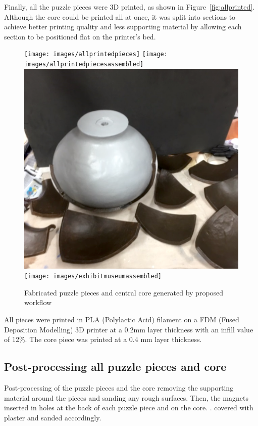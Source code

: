 \documentclass[acmlarge,screen,dvipsnames]{acmart}
\begin{document}
Finally, all the puzzle pieces were 3D printed, as shown in
Figure~\ref{fig:allprinted}. Although the core could be printed all at
once, it was split into  sections to achieve better printing
quality and less supporting material by allowing each section to be
positioned flat on the printer's bed.

\begin{figure}[htb]
  \centering
  {\texttt{[image: images/allprintedpieces]}}
  {\texttt{[image: images/allprintedpiecesassembled]}}\\
   {\includegraphics[width=0.4299\linewidth]{images/painting}}
  {\texttt{[image: images/exhibitmuseumassembled]}}
    \caption{Fabricated puzzle pieces and central core generated by proposed workflow }
\end{figure}

All pieces were printed in PLA (Polylactic Acid) filament on a FDM
(Fused Deposition Modelling) 3D printer at a 0.2mm layer thickness with
an infill value of 12\%. The core piece was printed at a 0.4 mm layer
thickness.


\subsection{Post-processing all puzzle pieces and core}

Post-processing of the puzzle pieces and the core  removing
the supporting material around the pieces and sanding any rough
surfaces. Then, the magnets  inserted in holes at the back of each
puzzle piece and on the core. .  covered \MSedit[afterwards]{} with plaster and sanded accordingly.
\end{document}

